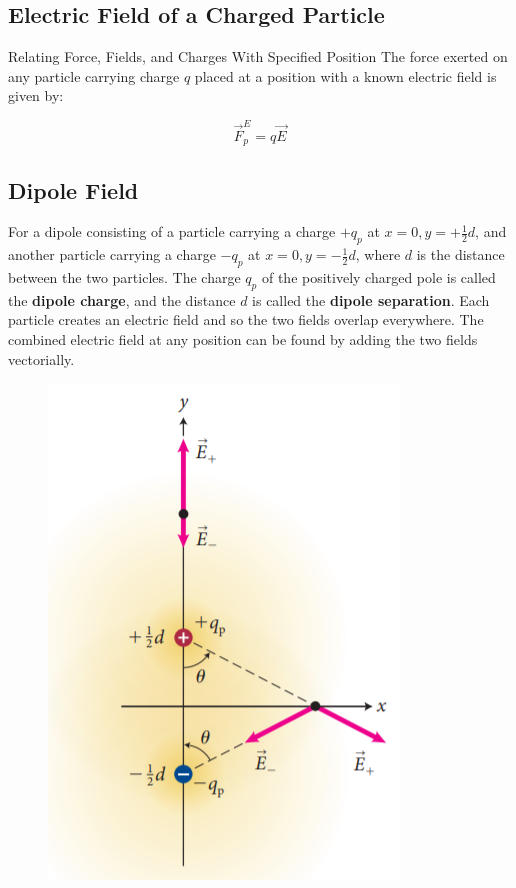     \subsection{Electric Field of a Charged Particle}   %

        \begin{axiom}{Relating Force, Fields, and Charges With Specified Position}
            The force exerted on any particle carrying charge $q$ placed at a position with a known electric field is given by:

            \[
                \vec{F}^E_p = q\vec{E}
            \]
        \end{axiom}


    \subsection{Dipole Field}   %

        For a dipole consisting of a particle carrying a charge $+q_p$ at $x = 0, y = + \frac{1}{2}d$, and another particle carrying a charge $-q_p$ at $x=0, y = -\frac{1}{2}d$, where $d$ is the distance between the two
        particles. The charge $q_p$ of the positively charged pole is called the \textbf{dipole charge}, and the distance $d$ is called the \textbf{dipole separation}. Each particle creates an electric field and so the
        two fields overlap everywhere. The combined electric field at any position can be found by adding the two fields vectorially.

        \begin{figure}[hbt!]
            \centering
            \includegraphics[]{Resources/24.4_Dipole_Field}
        \end{figure}

